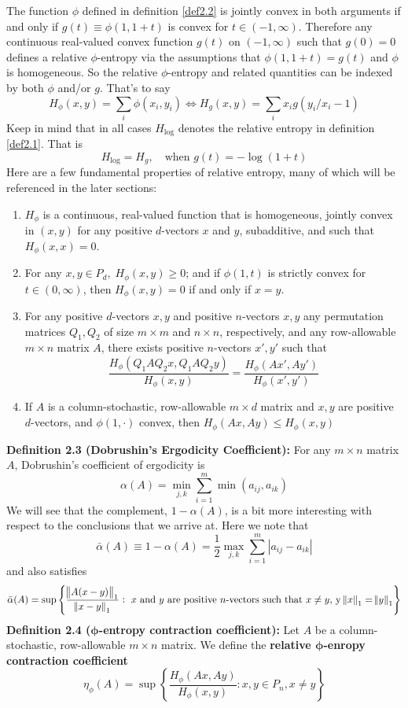 The function $\phi$ defined in definition \ref{def2.2} is jointly convex in both arguments if and only if $g(t)\equiv \phi(1,1+t)$ is convex for $t \in (-1, \infty)$. Therefore any continuous real-valued convex function $g(t)$ on $(-1, \infty)$ such that $g(0)=0$ defines a relative $\phi$-entropy via the assumptions that $\phi(1,1+t) = g(t)$ and $\phi$ is homogeneous. So the relative $\phi$-entropy and related quantities can be indexed by both $\phi$ and/or $g$. That's to say \[H_\phi(x,y)=\sum_i\phi(x_i,y_i) \iff H_g(x,y) = \sum_i x_ig(y_i/x_i - 1)\]  
Keep in mind that in all cases $H_{\log}$ denotes the relative entropy in definition \ref{def2.1}. That is \[H_{\log} = H_g, \quad \text{when } g(t) = -\log(1+t)\] 
Here are a few fundamental properties of relative entropy, many of which will be referenced in the later sections:\vspace{-0.75em}
\begin{enumerate}
    \itemsep0em
    \item \label{prop1} $H_\phi$ is a continuous, real-valued function that is homogeneous, jointly convex in $(x,y)$ for any positive $d$-vectors $x$ and $y$, subadditive, and such that $H_\phi(x,x) = 0$.
    \item \label{prop2} For any $x,y \in P_d, \; H_\phi(x,y) \geq 0$; and if $\phi(1,t)$ is strictly convex for $t \in (0, \infty)$, then $H_\phi(x,y) = 0$ if and only if $x = y$.
    \item \label{prop3} For any positive $d$-vectors $x,y$ and positive $n$-vectors $x,y$ any permutation matrices $Q_1, Q_2$ of size $m \times m$ and $n \times n$, respectively, and any row-allowable $m\times n$ matrix $A$, there exists positive $n$-vectors $x', y'$ such that \[\frac{H_\phi(Q_1 A Q_2 x, Q_1 A Q_2 y)}{H_\phi(x,y)} = \frac{H_\phi(Ax', Ay')}{H_\phi(x',y')}\]
    \item \label{prop4} If $A$ is a column-stochastic, row-allowable $m \times d$ matrix and $x,y$ are positive $d$-vectors, and $\phi(1, \cdot)$ convex, then $H_\phi(Ax, Ay) \leq H_\phi (x,y)$
\end{enumerate}
\noindent\textbf{Definition 2.3 (Dobrushin's Ergodicity Coefficient):} For any $m \times n$ matrix $A$, Dobrushin's coefficient of ergodicity is
\[\alpha(A) = \min_{j, k}\sum_{i = 1}^m \min(a_{ij},a_{ik})\] 
We will see that the complement, $1- \alpha(A)$, is a bit more interesting with respect to the conclusions that we arrive at. Here we note that 
\[\bar{\alpha}(A) \equiv 1 - \alpha(A) = \frac{1}{2} \max_{j,k}\sum_{i = 1}^m|a_{ij} - a_{ik}|\]
and also satisfies
\[\bar{\alpha}(A) = \sup \left\{\frac{\norm{A(x-y)}_1}{\norm{x-y}_1}: \text{ $x$ and $y$ are positive $n$-vectors such that } x\neq y, \, \text{y} \, \norm{x}_1 = \norm{y}_1\right\}\]
\textbf{Definition 2.4 ($\bm{\phi}$-entropy contraction coefficient):} Let $A$ be a column-stochastic, row-allowable $m \times n$ matrix. We define the \textbf{relative $\bm{\phi}$-enropy contraction coefficient} \[\eta_\phi (A) = \sup \left\{\frac{H_\phi(Ax, Ay)}{H_\phi(x,y)}: x,y \in P_n, x \neq y\right\}\]





